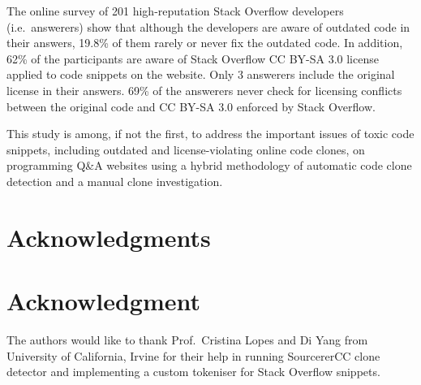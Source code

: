 \documentclass[10pt,journal,compsoc]{IEEEtran}
\begin{document}
The online survey of 201 high-reputation Stack Overflow developers (i.e.~answerers)
show that although the developers are aware of outdated code in their answers,
19.8\% of them rarely or never fix the outdated code. In addition, 62\% of the participants
are aware of Stack Overflow CC BY-SA 3.0 license applied to code snippets on the website.
Only 3 answerers include the original license in their answers. 69\% of the answerers
never check for licensing conflicts between the original code and CC BY-SA 3.0 
enforced by Stack Overflow.

This study is among, if not the first, to address the important issues of toxic
code snippets, including outdated and license-violating online code clones, on
programming Q\&A websites using a hybrid methodology of automatic code clone
detection and a manual clone investigation.


\ifCLASSOPTIONcompsoc
  \section*{Acknowledgments}
\else
  \section*{Acknowledgment}
\fi


The authors would like to thank Prof.~Cristina Lopes and Di Yang
from University of California, Irvine
for their help in running SourcererCC clone detector and implementing
a custom tokeniser for Stack Overflow snippets.



  

% 

\end{document}
